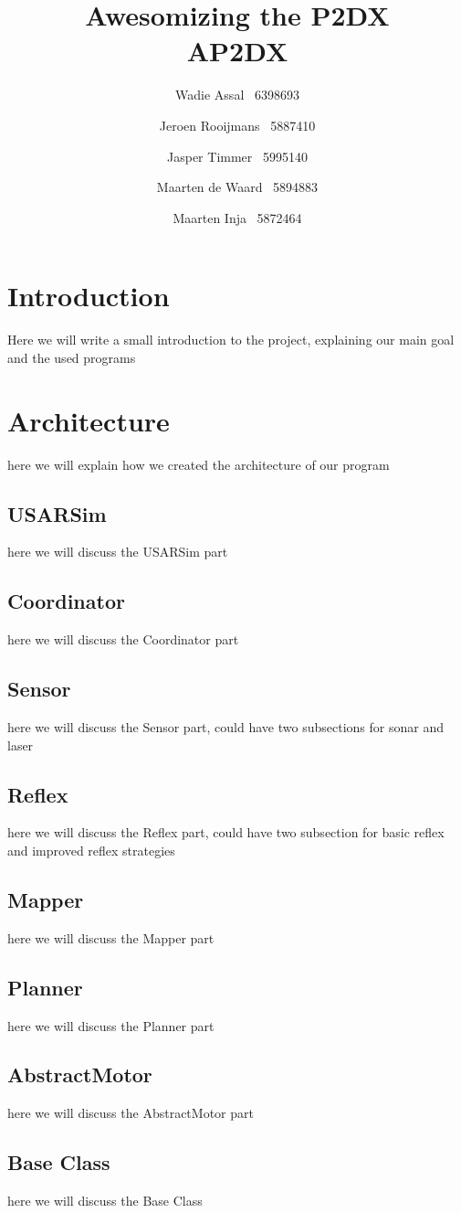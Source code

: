 \documentclass[a4paper,10pt]{article}
\title{Awesomizing the P2DX\\\small AP2DX}
\author{Wadie Assal \ 6398693 \and Jeroen Rooijmans \ 5887410 \and Jasper Timmer
\ 5995140 \and Maarten de Waard \ 5894883 \and  Maarten Inja \ 5872464}
\begin{document}
\maketitle
\newpage

\section{Introduction}
Here we will write a small introduction to the project, explaining our main goal and the used programs
\section{Architecture}
here we will explain how we created the architecture of our program
\subsection{USARSim}
here we will discuss the USARSim part
\subsection{Coordinator}
here we will discuss the Coordinator part
\subsection{Sensor}
here we will discuss the Sensor part, could have two subsections for sonar and laser
\subsection{Reflex}
here we will discuss the Reflex part, could have two subsection for basic reflex and improved reflex strategies
\subsection{Mapper}
here we will discuss the Mapper part
\subsection{Planner}
here we will discuss the Planner part
\subsection{AbstractMotor}
here we will discuss the AbstractMotor part
\subsection{Base Class}
here we will discuss the Base Class
\end{document}
